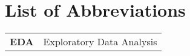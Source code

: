 \section*{List of Abbreviations}

\begin{tabular}{ l l }
  \textbf{EDA} & Exploratory Data Analysis  \\
\end{tabular}